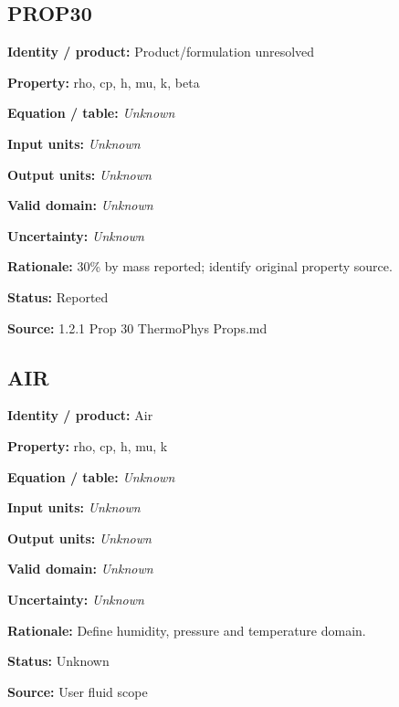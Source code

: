 \documentclass[11pt]{article}
\begin{document}
\par\noindent\begin{minipage}{\textwidth}\small\setlength{\parskip}{2pt}
\subsection*{PROP30}
\textbf{Identity / product:} Product/formulation unresolved\par
\textbf{Property:} rho, cp, h, mu, k, beta\par
\textbf{Equation / table:} \textit{Unknown}\par
\textbf{Input units:} \textit{Unknown}\par
\textbf{Output units:} \textit{Unknown}\par
\textbf{Valid domain:} \textit{Unknown}\par
\textbf{Uncertainty:} \textit{Unknown}\par
\textbf{Rationale:} 30\% by mass reported; identify original property source.\par
\textbf{Status:} Reported\par
\textbf{Source:} 1.2.1 Prop 30 ThermoPhys Props.md\par
\end{minipage}\par\vspace{5pt}
\par\noindent\begin{minipage}{\textwidth}\small\setlength{\parskip}{2pt}
\subsection*{AIR}
\textbf{Identity / product:} Air\par
\textbf{Property:} rho, cp, h, mu, k\par
\textbf{Equation / table:} \textit{Unknown}\par
\textbf{Input units:} \textit{Unknown}\par
\textbf{Output units:} \textit{Unknown}\par
\textbf{Valid domain:} \textit{Unknown}\par
\textbf{Uncertainty:} \textit{Unknown}\par
\textbf{Rationale:} Define humidity, pressure and temperature domain.\par
\textbf{Status:} Unknown\par
\textbf{Source:} User fluid scope\par
\end{minipage}\par\vspace{5pt}
\end{document}
